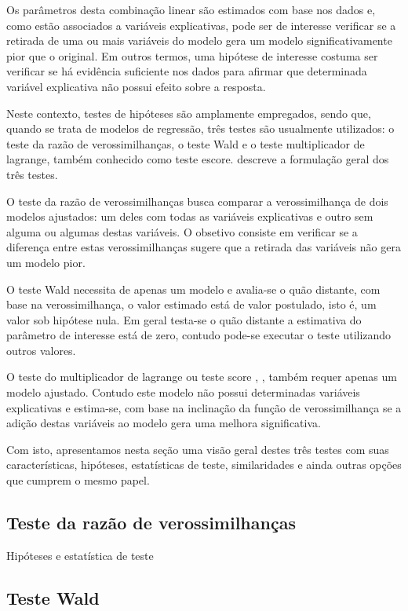 Os parâmetros desta combinação linear são estimados com base nos dados e, como estão associados a variáveis explicativas, pode ser de interesse verificar se a retirada de uma ou mais variáveis do modelo gera um modelo significativamente pior que o original. Em outros termos, uma hipótese de interesse costuma ser verificar se há evidência suficiente nos dados para afirmar que determinada variável explicativa não possui efeito sobre a resposta.

Neste contexto, testes de hipóteses são amplamente empregados, sendo que, quando se trata de modelos de regressão, três testes são usualmente utilizados: o teste da razão de verossimilhanças, o teste Wald e o teste multiplicador de lagrange, também conhecido como teste escore. \citet{engle} descreve a formulação geral dos três testes.

O teste da razão de verossimilhanças \citep{trv} busca comparar a  verossimilhança de dois modelos ajustados: um deles com todas as variáveis explicativas e outro sem alguma ou algumas destas variáveis. O obsetivo consiste em verificar se a diferença entre estas verossimilhanças sugere que a retirada das variáveis não gera um modelo pior.

O teste Wald \citep{wald} necessita de apenas um modelo e avalia-se o quão distante, com base na verossimilhança, o valor estimado está de valor postulado, isto é, um valor sob hipótese nula. Em geral testa-se o quão distante a estimativa do parâmetro de interesse está de zero, contudo pode-se executar o teste utilizando outros valores.

O teste do multiplicador de lagrange ou teste score \citep{score1}, \citep{score2}, \citep{score3} também requer apenas um modelo ajustado. Contudo este modelo não possui determinadas variáveis explicativas e estima-se, com base na inclinação da função de verossimilhança se a adição destas variáveis ao modelo gera uma melhora significativa.

Com isto, apresentamos nesta seção uma visão geral destes três testes com suas características, hipóteses, estatísticas de teste, similaridades e ainda outras opções que cumprem o mesmo papel.

\subsection{Teste da razão de verossimilhanças}

Hipóteses e estatística de teste

\subsection{Teste Wald}

